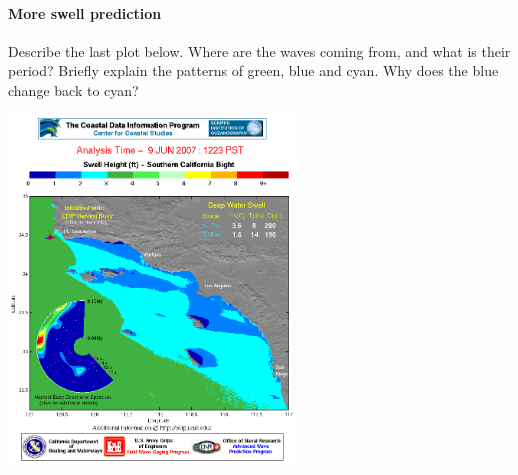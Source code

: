 \paragraph{More swell prediction}

Describe the last plot below. Where are the waves coming from, and what is their period? Briefly explain the patterns of green, blue and cyan. Why does the blue change back to cyan?

\includegraphics[width=3in]{figs/Waves/socal_June92007}


